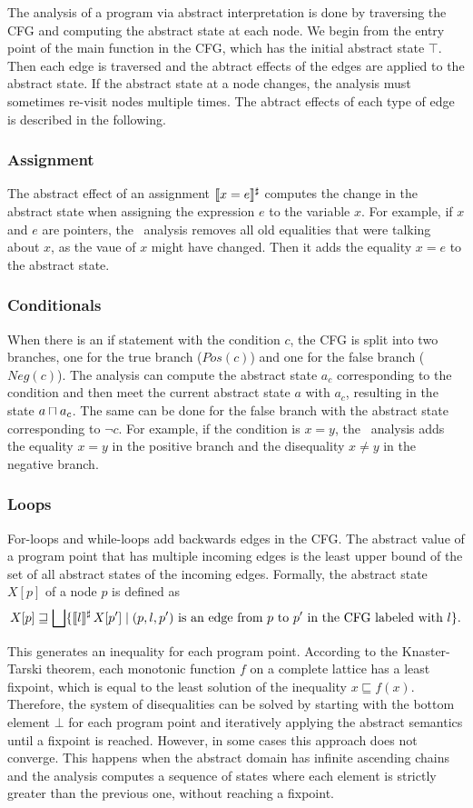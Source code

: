 The analysis of a program via abstract interpretation is done by traversing the CFG and computing the abstract state at each node.
We begin from the entry point of the \textsf{main} function in the CFG, which has the initial abstract state $\top$.
Then each edge is traversed and the abtract effects of the edges are applied to the abstract state.
If the abstract state at a node changes, the analysis must sometimes re-visit nodes multiple times.
The abtract effects of each type of edge is described in the following.

\subsubsection{Assignment}
The abstract effect of an assignment $\llbracket x = e\rrbracket^\sharp$ computes the change in the abstract state when assigning the expression $e$ to the variable $x$.
For example, if $x$ and $e$ are pointers, the \cpo\ analysis removes all old equalities that were talking about $x$, as the vaue of $x$ might have changed.
Then it adds the equality $x = e$ to the abstract state.
\subsubsection{Conditionals}
When there is an if statement with the condition $c$, the CFG is split into two branches, one for the true branch ($Pos(c)$) and one for the false branch ($Neg(c)$).
The analysis can compute the abstract state $a_c$ corresponding to the condition and
then meet the current abstract state $a$ with $a_c$, resulting in the state $a \sqcap a_c$.
The same can be done for the false branch with the abstract state corresponding to $\neg c$.
For example, if the condition is $x = y$, the \cpo\ analysis adds the equality $x = y$
in the positive branch and the disequality $x \neq y$ in the negative branch.
\subsubsection{Loops}
For-loops and while-loops add backwards edges in the CFG.
The abstract value of a program point that has multiple incoming edges is
the least upper bound of the set of all abstract states of the incoming edges.
Formally, the abstract state $X[p]$ of a node $p$ is defined as
\[
X[p] \sqsupseteq \bigsqcup \{\llbracket l\rrbracket^\sharp\,X[p'] \mid (p,l,p') \text{ is an edge from $p$ to $p'$ in the CFG labeled with $l$}\}.
\]

This generates an inequality for each program point.
According to the Knaster-Tarski theorem, each monotonic function $f$ on a complete lattice has a least fixpoint, which is equal to the least solution of the inequality $x \sqsubseteq f(x)$.
Therefore, the system of disequalities can be solved by starting with the bottom element $\bot$ for
each program point and iteratively applying the abstract semantics until a fixpoint is reached.
However, in some cases this approach does not converge.
This happens when the abstract domain has infinite ascending chains and the analysis
computes a sequence of states where each element is strictly greater than the previous one,
without reaching a fixpoint.

